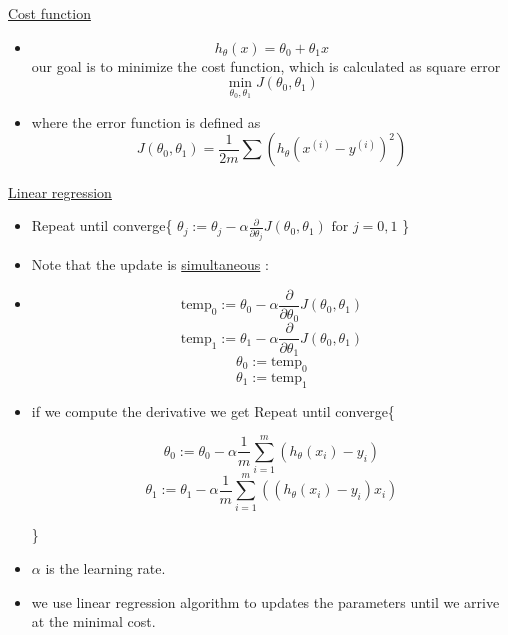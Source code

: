\documentclass[12pt]{article}
\begin{document}
\underline{Cost function}
\begin{itemize}
	\item \[h_{\theta}(x) = \theta_0 + \theta_1x\]
	 our goal is to minimize the cost function, which is calculated as square error
	 \[\min_{\theta_0,\theta_1} J(\theta_0,\theta_1)\]
	\item where the error function is defined as
	 \[J(\theta_0,\theta_1) = \frac{1}{2m} \sum_{}^{}(h_\theta(x^{(i)} - y ^{(i)})^2)\]
\end{itemize}

\underline{Linear regression}
\begin{center}
	\begin{itemize}
		\item 	Repeat until converge\{
		$  \theta_j := \theta_j - \alpha\frac{\partial}{\partial \theta_j}J(\theta_0,\theta_1) \text{ for } j = 0,1 $ \}	
		\item  Note that the update is \underline{simultaneous} :
		\item 
		\[ \text{temp}_0 := \theta_0 - \alpha\frac{\partial}{\partial \theta_0}J(\theta_0,\theta_1) \] 
		\[ \text{temp}_1 := \theta_1 - \alpha\frac{\partial}{\partial \theta_1}J(\theta_0,\theta_1) \]
		\[\theta_0 := \text{temp}_0 \]
		\[\theta_1 := \text{temp}_1\]
		\item if we compute the derivative we get
		Repeat until converge\{
		
		\[ \theta_0 := \theta_0 - \alpha\frac{1}{m}\sum_{i=1}^{m}(h_{\theta}(x_i)-y_i) \] 
		\[ \theta_1 := \theta_1 - \alpha\frac{1}{m}\sum_{i=1}^{m}((h_{\theta}(x_i)-y_i) x_i)\] 
		
		\}	
		
		\item $\alpha$ is the learning rate. 
		\item we use linear regression algorithm to updates the parameters until we arrive at the minimal cost.
	\end{itemize}

\end{center}
\end{document}
